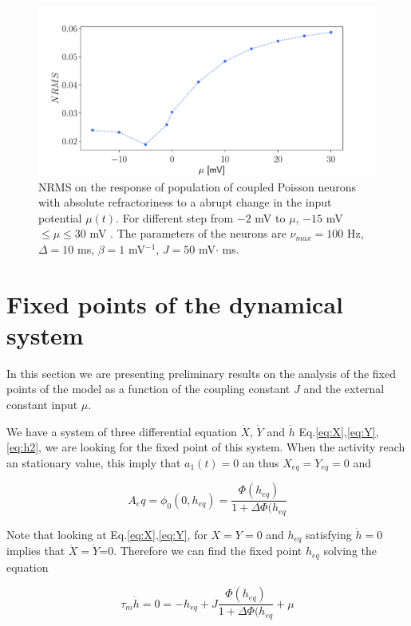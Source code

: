 \documentclass[12pt,twoside]{report}
\begin{document}
\begin{figure}[h!]
	\centering
	\includegraphics[width=0.8\linewidth]{NRMSstep_coupled.pdf}
	\caption{NRMS on the response of population of coupled Poisson neurons with absolute refractoriness to a abrupt change in the input potential $\mu(t)$. For different step from $-2$ mV to $\mu$,  $-15$ mV$\leq\mu\leq30$ mV . The parameters of the neurons are $\nu_{max}=100$ Hz, $\Delta=10$ ms, $\beta=1$ mV$^{-1}$, $J=50$ mV$\cdot$ ms.
	}
	\label{fig:NRMSstep_coupled}
\end{figure}


\section{Fixed points of the dynamical system} 
\label{sec:fixpoint}
In this section we are presenting preliminary results on the analysis of the fixed points of the model as a function of the coupling constant $J$ and the external constant input $\mu$. 

We have a system of three differential equation $\dot{X}$, $\dot{Y}$ and $\dot{h}$ Eq.\eqref{eq:X},\eqref{eq:Y},\eqref{eq:h2}, we are looking for the fixed point of this system. When the activity reach an stationary value, this imply that $a_1(t)=0$ an thus $X_{eq}=Y_{eq}=0$ and 


\begin{equation}
A_eq=\phi_0(0,h_{eq})=\frac{\Phi(h_{eq})}{1+\Delta \Phi(h_{eq}} 
\end{equation} 

Note that looking at Eq.\eqref{eq:X},\eqref{eq:Y}, for $X=Y=0$ and $h_{eq}$ satisfying $\dot{h}=0$ implies that $\dot{X}=\dot{Y}$=0. Therefore we can find the fixed point $h_{eq}$ solving the equation

\begin{equation}
\label{eq:hdot}
\tau_m \dot{h}=0=-h_{eq}+J\frac{\Phi(h_{eq})}{1+\Delta \Phi(h_{eq}} +\mu
\end{equation}
\end{document}
